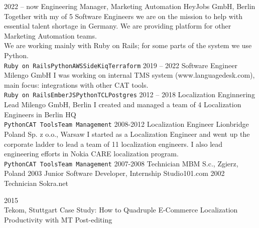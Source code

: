 \documentclass[8pt]{developercv} %
\begin{document}
\begin{entrylist}
	\entry
		{2022 -- now}
		{Engineering Manager, Marketing Automation}
		{HeyJobs GmbH, Berlin}
		{Together with my of 5 Software Engineers we are on the mission to help with essential talent shortage in Germany. We are providing platform for other Marketing Automation teams.\\ We are working mainly with Ruby on Rails; for some parts of the system we use Python.
		\\ \texttt{Ruby on Rails}\slashsep\texttt{Python}\slashsep\texttt{AWS}\slashsep\texttt{SideKiq}\slashsep\texttt{Terraform}}
	\entry
		{2019 -- 2022}
		{Software Engineer}
		{Milengo GmbH}
		{I was working on internal TMS system (www.languagedesk.com), main focus: integrations with other CAT tools.
			\\ \texttt{Ruby on Rails}\slashsep\texttt{EmberJS}\slashsep\texttt{Python}\slashsep\texttt{TCL}\slashsep\texttt{Postgres}}
	\entry
		{2012 -- 2018}
		{Localization Enginnering Lead}
		{Milengo GmbH, Berlin}
		{I created and managed a team of 4 Localization Engineers in Berlin HQ
		\\ \texttt{Python}\slashsep\texttt{CAT Tools}\slashsep\texttt{Team Management}}
	\entry
		{2008-2012}
		{Localization Engineer}
		{Lionbridge Poland Sp. z o.o., Warsaw}
		{I started as a Localization Engineer and went up the corporate ladder to lead a team of 11 localization engineers.
		I also lead engineering efforts in Nokia CARE localization program.
		\\ \texttt{Python}\slashsep\texttt{CAT Tools}\slashsep\texttt{Team Management}}
	\entry
		{2007-2008}
		{Technician}
		{MBM S.c., Zgierz, Poland }
		{ }
	\entry
		{2003}
		{Junior Software Developer, Internship}
		{Studio101.com }
		{ }
	\entry
		{2002}
		{Technician}
		{Sokra.net }
		{ }
\end{entrylist}


\begin{entrylist}
	\entry
		{2015}
		{ \\ }
		{Tekom, Stuttgart}
		{Case Study: How to Quadruple E-Commerce Localization Productivity with 
		MT Post-editing }
\end{entrylist}



\end{document}
